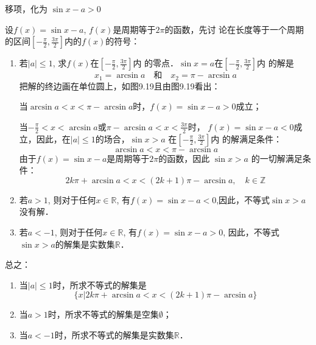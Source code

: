 \begin{solution}
    移项，化为
    $\sin x-a>0$

    设$f(x)=\sin x-a$, $f(x)$是周期等于$2\pi$的函数，先讨
    论在长度等于一个周期的区间$\left[-\frac{\pi}{2}, \frac{3\pi}{2}\right]$内的$f(x)$的符号：
\begin{enumerate}
    \item 若$|a|\le 1$, 求$f(x)$在$\left[-\frac{\pi}{2}, \frac{3\pi}{2}\right]$内
    的零点．$\sin x=a$在$\left[-\frac{\pi}{2}, \frac{3\pi}{2}\right]$内
    的解是
    \[    x_1=\arcsin a \quad \text{和}\quad x_2=\pi-\arcsin a\]
    把解的终边画在单位圆上，如图9.19且由图9.19看出：
\begin{figure}[htp]
    \centering
{}
    \caption{}
\end{figure}

    当$\arcsin a<x<\pi-\arcsin a$时，$f(x)=\sin x-a>0$成立；

    当$-\frac{\pi}{2}<x<\arcsin a$或$\pi-\arcsin a<x<\frac{3\pi}{2}$时，
    $f(x)=\sin x-a<0$成立，因此，在$|a|\le 1$的场合，$\sin x>a$
    在$\left[-\frac{\pi}{2}, \frac{3\pi}{2}\right]$内
    的解满足条件：
\[    \arcsin a<x<\pi-\arcsin a\]
由于$f(x)=\sin x-a$是周期等于$2\pi$的函数，因此
$\sin x>a$
的一切解满足条件：
\[2k\pi+\arcsin a<x<(2k+1)\pi-\arcsin a,\quad k\in\mathbb{Z}\]
\item  若$a>1$, 则对于任何$x\in\mathbb{R}$, 有$f(x)=\sin x-a<0$,因此，不等式$\sin x>a$没有解．
\item 若$a<-1$, 则对于任何$x\in\mathbb{R}$, 有$f(x)=\sin x-a>0$,
因此，不等式$\sin x>a$的解集是实数集$\mathbb{R}$．
\end{enumerate}

总之：
\begin{enumerate}
\item 当$|a|\le 1$时，所求不等式的解集是$$\{x|2k\pi+
\arcsin a<x<(2k+1)\pi-\arcsin a\}$$
\item 当$a>1$时，所求不等式的解集是空集$\emptyset$；
\item 当$a<-1$时，所求不等式的解集是实数集$\mathbb{R}$．
\end{enumerate}
\end{solution}


